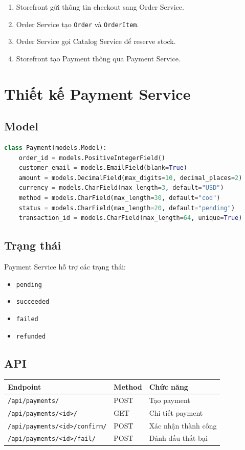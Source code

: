 \documentclass[12pt,a4paper]{report}
\begin{document}
\begin{enumerate}
  \item Storefront gửi thông tin checkout sang Order Service.
  \item Order Service tạo \texttt{Order} và \texttt{OrderItem}.
  \item Order Service gọi Catalog Service để reserve stock.
  \item Storefront tạo Payment thông qua Payment Service.
\end{enumerate}

\section{Thiết kế Payment Service}

\subsection{Model}

\begin{lstlisting}[style=code,language=Python]
class Payment(models.Model):
    order_id = models.PositiveIntegerField()
    customer_email = models.EmailField(blank=True)
    amount = models.DecimalField(max_digits=10, decimal_places=2)
    currency = models.CharField(max_length=3, default="USD")
    method = models.CharField(max_length=30, default="cod")
    status = models.CharField(max_length=20, default="pending")
    transaction_id = models.CharField(max_length=64, unique=True)
\end{lstlisting}

\subsection{Trạng thái}

Payment Service hỗ trợ các trạng thái:

\begin{itemize}
  \item \texttt{pending}
  \item \texttt{succeeded}
  \item \texttt{failed}
  \item \texttt{refunded}
\end{itemize}

\subsection{API}

\begin{longtable}{|p{5cm}|p{3cm}|p{6cm}|}
\hline
\textbf{Endpoint} & \textbf{Method} & \textbf{Chức năng} \\
\hline
\texttt{/api/payments/} & POST & Tạo payment \\
\hline
\texttt{/api/payments/<id>/} & GET & Chi tiết payment \\
\hline
\texttt{/api/payments/<id>/confirm/} & POST & Xác nhận thành công \\
\hline
\texttt{/api/payments/<id>/fail/} & POST & Đánh dấu thất bại \\
\hline
\end{longtable}
\end{document}
